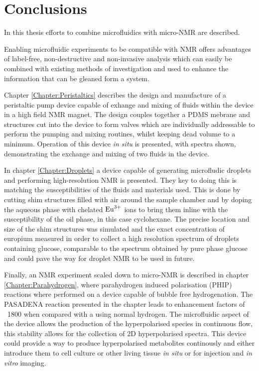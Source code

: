 \chapter{Conclusions} \label{Chapter:Conclusions}

In this thesis efforts to combine microfluidics with micro-NMR are described.

Enabling microfluidic experiments to be compatible with NMR offers advantages
of label-free, non-destructive and non-invasive analysis which can easily
be combined with existing methods of investigation and used to
enhance the information that can be gleaned form a system.

Chapter \ref{Chapter:Peristaltics} describes the design and manufacture of a
peristaltic pump device capable of exhange and mixing of fluids within the device in
a high field NMR magnet. The design couples together a PDMS mebrane and structures cut into
the device to form valves which are individually addressable to perform the pumping and mixing
routines, whilst keeping dead volume to a minimum. Operation of this device \textit{in situ} is presented,
with spectra shown, demonstrating the exchange and mixing of two fluids in the device.

In chapter \ref{Chapter:Droplets} a device capable of generating microfludic
droplets and performing high-resolution NMR is presented. They key to doing this
is matching the susceptibilities of the fluids and materials used. This is done
by cutting shim structures filled with air around the sample chamber and by
doping the aqueous phase with chelated $\ce{Eu^3+}$ ions to bring them inline
with the susceptibility of the oil phase, in this case cyclohexane. The
precise location and size of the shim structures was simulated and the
exact concentration of europium measured in order to collect a high
resolution spectrum of droplets containing glucose, comparable to the spectrum
obtained by pure phase glucose and could pave the way for droplet NMR to be used
in future.

Finally, an NMR experiment scaled down to micro-NMR is described in chapter \ref{Chapter:Parahydrogen},
where parahydrogen induced polarisation (PHIP) reactions where performed on a device
capable of bubble free hydrogenation. The PASADENA reaction presented in the chapter
leads to enhancement factors of ~1800 when compared with a using normal hydrogen. The microfluidic
aspect of the device allows the production of the hyperpolarised species in continuous flow, this
stability allows for the collection of 2D hyperpolarised spectra. This device could provide a
way to produce hyperpolarised metabolites continously and either introduce them to  cell culture
or other living tissue \textit{in situ} or for injection and \textit{in vitro} imaging.

